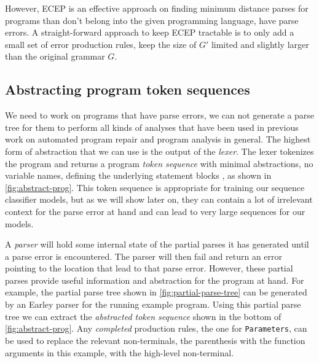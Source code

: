 However, ECEP is an effective approach on finding minimum distance parses for
programs than don't belong into the given programming language, \ie have parse
errors. A straight-forward approach to keep ECEP tractable is to only add a
small set of error production rules, \ie keep the size of $G'$ limited and
slightly larger than the original grammar $G$.

\subsection{Abstracting program token sequences}
\label{sec:overview:abstraction}

We need to work on programs that have parse errors, \ie we can not generate a
parse tree for them to perform all kinds of analyses that have been used in
previous work on automated program repair \citep{Sakkas_2020,
Martinez_2013,Gulwani_2018, Wang_2018} and program analysis in general.
%
The highest form of abstraction that we can use is the output of the
\emph{lexer}. The lexer tokenizes the program and returns a program \emph{token
sequence} with minimal abstractions, \eg no variable names, defining the
underlying statement blocks \etc, as shown in \autoref{fig:abstract-prog}. This
token sequence is appropriate for training our sequence classifier models, but
as we will show later on, they can contain a lot of irrelevant context for the
parse error at hand and can lead to very large sequences for our models.

 A \emph{parser} will hold some
internal state of the partial parses it has generated until a parse error is
encountered. The parser will then fail and return an error pointing to the
location that lead to that parse error. However, these partial parses provide
useful information and abstraction for the program at hand. For example, the
partial parse tree shown in \autoref{fig:partial-parse-tree} can be generated by
an Earley parser for the running example program. Using this partial parse tree
we can extract the \emph{abstracted token sequence} shown in the bottom of
\autoref{fig:abstract-prog}. Any \emph{completed} production rules, \eg the
one for \texttt{Parameters}, can be used to replace the relevant non-terminals,
\eg the parenthesis with the function arguments in this example, with the
high-level non-terminal.





